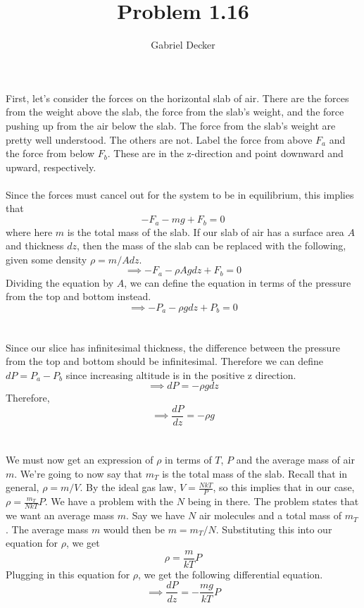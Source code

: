 \documentclass[12pt]{article}
\title{Problem 1.16}
\author{Gabriel Decker}
\begin{document}
\maketitle
\begin{flushleft}

First, let's consider the forces on the horizontal slab of air.
There are the forces from the weight above the slab, the force from the slab's weight, and the force pushing up from the air below the slab.
The force from the slab's weight are pretty well understood.
The others are not.
Label the force from above $F_a$ and the force from below $F_b$.
These are in the z-direction and point downward and upward, respectively.\\~\\

Since the forces must cancel out for the system to be in equilibrium, this implies that
$$-F_a-mg+F_b=0$$
where here $m$ is the total mass of the slab.
If our slab of air has a surface area $A$ and thickness $dz$, then the mass of the slab can be replaced with the following, given some density $\rho=m/Adz$.
$$\implies -F_a-\rho Agdz+F_b=0$$
Dividing the equation by $A$, we can define the equation in terms of the pressure from the top and bottom instead.
$$\implies -P_a-\rho gdz+P_b=0$$\\~\\

Since our slice has infinitesimal thickness, the difference between the pressure from the top and bottom should be infinitesimal.
Therefore we can define $dP=P_a-P_b$ since increasing altitude is in the positive z direction.
$$\implies dP=-\rho gdz$$
Therefore, 
$$\implies \frac{dP}{dz}=-\rho g$$\\~\\

We must now get an expression of $\rho$ in terms of $T$, $P$ and the average mass of air $m$.
We're going to now say that $m_T$ is the total mass of the slab.
Recall that in general, $\rho=m/V$.
By the ideal gas law, $V=\frac{NkT}{P}$, so this implies that in our case, $\rho=\frac{m_T}{NkT}P$.
We have a problem with the $N$ being in there.
The problem states that we want an average mass $m$.
Say we have $N$ air molecules and a total mass of $m_T$.
The average mass $m$ would then be $m=m_T/N$.
Substituting this into our equation for $\rho$, we get
$$\rho=\frac{m}{kT}P$$
Plugging in this equation for $\rho$, we get the following differential equation.
$$\implies \frac{dP}{dz}=-\frac{mg}{kT}P$$\\~\\


\end{flushleft}
\end{document}
